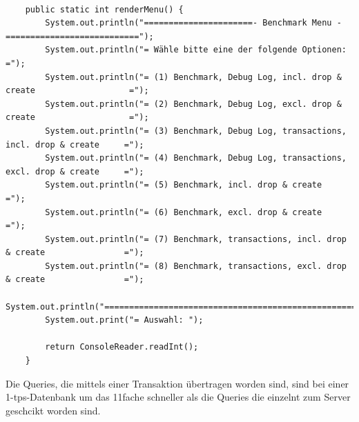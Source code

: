 \begin{lstlisting}

	public static int renderMenu() {
		System.out.println("======================- Benchmark Menu -===========================");
		System.out.println("= Wähle bitte eine der folgende Optionen:                         =");
		System.out.println("= (1) Benchmark, Debug Log, incl. drop & create                   =");
		System.out.println("= (2) Benchmark, Debug Log, excl. drop & create                   =");
		System.out.println("= (3) Benchmark, Debug Log, transactions, incl. drop & create     =");
		System.out.println("= (4) Benchmark, Debug Log, transactions, excl. drop & create     =");
		System.out.println("= (5) Benchmark, incl. drop & create                              =");
		System.out.println("= (6) Benchmark, excl. drop & create                              =");
		System.out.println("= (7) Benchmark, transactions, incl. drop & create                =");
		System.out.println("= (8) Benchmark, transactions, excl. drop & create                =");
		System.out.println("===================================================================");
		System.out.print("= Auswahl: ");
		
		return ConsoleReader.readInt();
	}
\end{lstlisting}

 
Die Queries, die mittels einer Transaktion übertragen worden sind, sind bei
einer 1-tps-Datenbank um \ca das 11fache schneller als die Queries die einzelnt
zum Server geschcikt worden sind.

\begin{figure}[!htbp] 
\end{figure} 


